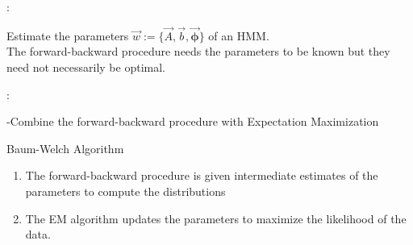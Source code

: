 \begin{frame}{\subsecname:~\subsubsecname}

Estimate the parameters $\vec{w} := \{
		\vec{A},
		\vec{b},
		\vec{\boldsymbol{\phi}}
		\}$ of an HMM.\\
		
The forward-backward procedure needs the parameters to be known but they need not necessarily be optimal.

\pause


\end{frame}

\begin{frame}{\subsecname:~\subsubsecname}


\pause

-Combine the forward-backward procedure with Expectation Maximization


\end{frame}

\begin{frame}{\subsubsecname}

\begin{block}{Baum-Welch Algorithm}
\begin{enumerate}
\item The forward-backward procedure is given intermediate estimates of the parameters to compute the distributions
\item The EM algorithm updates the parameters to maximize the likelihood of the data.
\end{enumerate}
\end{block}

\end{frame}


